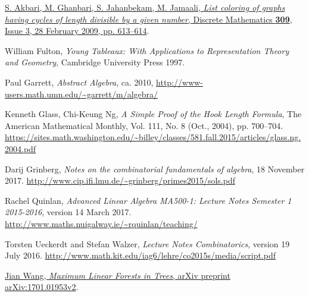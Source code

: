 \documentclass[numbers=enddot,12pt,final,onecolumn,notitlepage]{scrartcl}%
\theoremstyle{definition}
\begin{document}
\begin{thebibliography}{9999999999}                                                                                       %

\href{http://www.sciencedirect.com/science/article/pii/S0012365X08005244}{S. Akbari, M. Ghanbari, S. Jahanbekam, M. Jamaali, \textit{List coloring of graphs having cycles of length divisible by a given number}, Discrete Mathematics \textbf{309}, Issue 3, 28 February 2009, pp. 613--614}.

William Fulton, \textit{Young Tableaux: With
Applications to Representation Theory and Geometry}, Cambridge University
Press 1997.

Paul Garrett,
\textit{Abstract Algebra},
ca. 2010,
\newline\url{http://www-users.math.umn.edu/~garrett/m/algebra/}

Kenneth Glass, Chi-Keung Ng,
\textit{A Simple Proof of the Hook Length Formula},
The American Mathematical Monthly,
Vol. 111, No. 8 (Oct., 2004), pp. 700--704.
\newline\url{https://sites.math.washington.edu/~billey/classes/581.fall.2015/articles/glass.ng.2004.pdf}

Darij Grinberg, \textit{Notes on the combinatorial
fundamentals of algebra}, 18 November 2017.
\newline\url{http://www.cip.ifi.lmu.de/~grinberg/primes2015/sols.pdf}

Rachel Quinlan,
\textit{Advanced Linear Algebra MA500-1: Lecture Notes
Semester 1 2015-2016},
version 14 March 2017.
\newline\url{http://www.maths.nuigalway.ie/~rquinlan/teaching/}

Torsten Ueckerdt and Stefan Walzer,
\textit{Lecture Notes Combinatorics},
version 19 July 2016.
\newline\url{http://www.math.kit.edu/iag6/lehre/co2015s/media/script.pdf}

\href{http://lanl.arxiv.org/abs/1701.01953v2}{Jian Wang,
\textit{Maximum Linear Forests in Trees},
arXiv preprint arXiv:1701.01953v2}.

\end{thebibliography}
\end{document}
